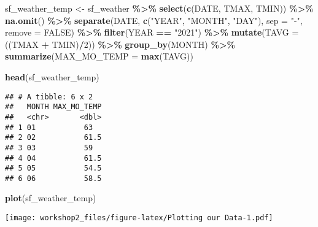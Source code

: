 \documentclass[
]{article}
\newenvironment{Shaded}{\begin{snugshade}}{\end{snugshade}}
\newcommand{\AttributeTok}[1]{\textcolor[rgb]{0.13,0.29,0.53}{#1}}
\newcommand{\ConstantTok}[1]{\textcolor[rgb]{0.56,0.35,0.01}{#1}}
\newcommand{\DecValTok}[1]{\textcolor[rgb]{0.00,0.00,0.81}{#1}}
\newcommand{\FunctionTok}[1]{\textcolor[rgb]{0.13,0.29,0.53}{\textbf{#1}}}
\newcommand{\NormalTok}[1]{#1}
\newcommand{\OtherTok}[1]{\textcolor[rgb]{0.56,0.35,0.01}{#1}}
\newcommand{\SpecialCharTok}[1]{\textcolor[rgb]{0.81,0.36,0.00}{\textbf{#1}}}
\newcommand{\StringTok}[1]{\textcolor[rgb]{0.31,0.60,0.02}{#1}}
\begin{document}
\begin{Shaded}
\begin{Highlighting}[]
\NormalTok{sf\_weather\_temp }\OtherTok{\textless{}{-}}\NormalTok{ sf\_weather }\SpecialCharTok{\%\textgreater{}\%}
  \FunctionTok{select}\NormalTok{(}\FunctionTok{c}\NormalTok{(DATE, TMAX, TMIN)) }\SpecialCharTok{\%\textgreater{}\%} 
  \FunctionTok{na.omit}\NormalTok{() }\SpecialCharTok{\%\textgreater{}\%}
  \FunctionTok{separate}\NormalTok{(DATE, }\FunctionTok{c}\NormalTok{(}\StringTok{"YEAR"}\NormalTok{, }\StringTok{"MONTH"}\NormalTok{, }\StringTok{"DAY"}\NormalTok{), }\AttributeTok{sep =} \StringTok{"{-}"}\NormalTok{, }\AttributeTok{remove =} \ConstantTok{FALSE}\NormalTok{) }\SpecialCharTok{\%\textgreater{}\%}
  \FunctionTok{filter}\NormalTok{(YEAR }\SpecialCharTok{==} \StringTok{"2021"}\NormalTok{) }\SpecialCharTok{\%\textgreater{}\%}
  \FunctionTok{mutate}\NormalTok{(}\AttributeTok{TAVG =}\NormalTok{ ((TMAX }\SpecialCharTok{+}\NormalTok{ TMIN)}\SpecialCharTok{/}\DecValTok{2}\NormalTok{)) }\SpecialCharTok{\%\textgreater{}\%}
  \FunctionTok{group\_by}\NormalTok{(MONTH) }\SpecialCharTok{\%\textgreater{}\%}
  \FunctionTok{summarize}\NormalTok{(}\AttributeTok{MAX\_MO\_TEMP =} \FunctionTok{max}\NormalTok{(TAVG))}

\FunctionTok{head}\NormalTok{(sf\_weather\_temp)}
\end{Highlighting}
\end{Shaded}

\begin{verbatim}
## # A tibble: 6 x 2
##   MONTH MAX_MO_TEMP
##   <chr>       <dbl>
## 1 01           63  
## 2 02           61.5
## 3 03           59  
## 4 04           61.5
## 5 05           54.5
## 6 06           58.5
\end{verbatim}

\begin{Shaded}
\begin{Highlighting}[]
\FunctionTok{plot}\NormalTok{(sf\_weather\_temp)}
\end{Highlighting}
\end{Shaded}

\texttt{[image: workshop2\_files/figure-latex/Plotting our Data-1.pdf]}
\end{document}
